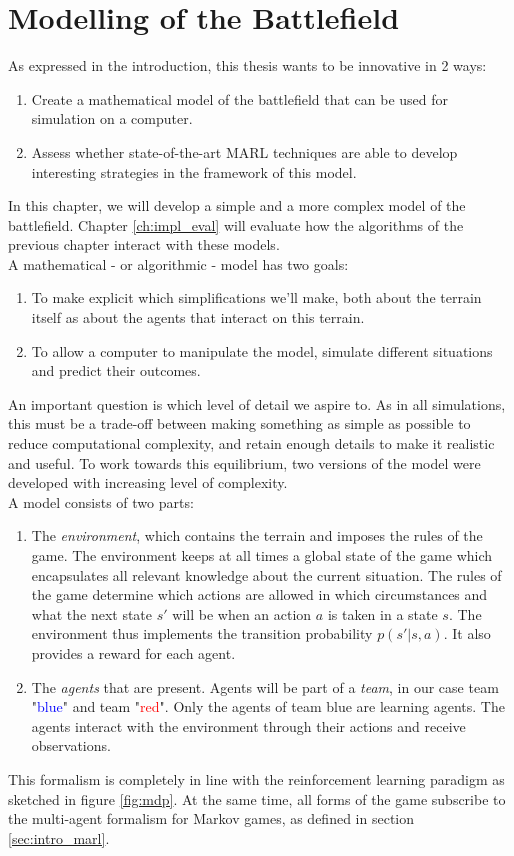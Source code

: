 \chapter{Modelling of the Battlefield}
\label{ch:modelling}
As expressed in the introduction, this thesis wants to be innovative in 2 ways:
\begin{enumerate}
    \item Create a mathematical model of the battlefield that can be used for simulation on a computer.
    \item Assess whether state-of-the-art MARL techniques are able to develop interesting strategies in the framework of this model.
\end{enumerate}
In this chapter, we will develop a simple and a more complex model of the battlefield.  Chapter \ref{ch:impl_eval} will evaluate how the algorithms of the previous chapter interact with these models.\\
A mathematical - or algorithmic - model has two goals:
\begin{enumerate}
    \item To make explicit which simplifications we'll make, both about the terrain itself as about the agents that interact on this terrain.
    \item To allow a computer to manipulate the model, simulate different situations and predict their outcomes.
\end{enumerate}
An important question is which level of detail we aspire to. As in all simulations, this must be a trade-off between making something as simple as possible to reduce computational complexity, and retain enough details to make it realistic and useful. To work towards this equilibrium, two versions of the model were developed with increasing level of complexity.\\
A model consists of two parts:
\begin{enumerate}
    \item The \emph{environment}, which contains the terrain and imposes the rules of the game. The environment keeps at all times a global state of the game which encapsulates all relevant knowledge about the current situation. The rules of the game determine which actions are allowed in which circumstances and what the next state $s'$ will be when an action $a$ is taken in a state $s$. The environment thus implements the transition probability $p(s'|s, a)$. It also provides a reward for each agent.
    \item The \emph{agents} that are present. Agents will be part of a \emph{team}, in our case team "\textcolor{blue}{blue}" and team "\textcolor{red}{red}". Only the agents of team blue are learning agents. The agents interact with the environment through their actions and receive observations.
\end{enumerate}
This formalism is completely in line with the reinforcement learning paradigm as sketched in figure \ref{fig:mdp}. At the same time, all forms of the game subscribe to the multi-agent formalism for Markov games, as defined in section \ref{sec:intro_marl}.

